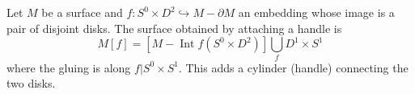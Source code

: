 Let $M$ be a surface and $f: S^0 \times D^2 \hookrightarrow M - \partial M$ an embedding whose image is a pair of disjoint disks. The surface obtained by attaching a handle is
$$M[f] = [M - \operatorname{Int} f(S^0 \times D^2)] \bigcup_f D^1 \times S^1$$
where the gluing is along $f|S^0 \times S^1$. This adds a cylinder (handle) connecting the two disks.
